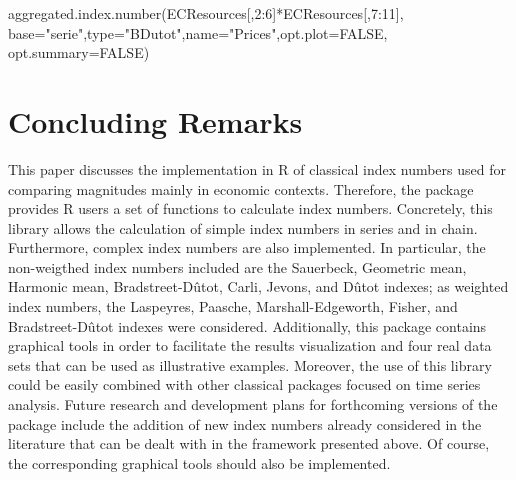 \begin{example}
aggregated.index.number(ECResources[,2:6]*ECResources[,7:11],
                        base="serie",type="BDutot",name="Prices",opt.plot=FALSE,
                        opt.summary=FALSE)
\end{example}

%
%
%
%
%
%
%


\section{Concluding Remarks}
This paper discusses the implementation in R of classical index numbers used for comparing magnitudes mainly in economic contexts. Therefore, the  package provides R users a set of functions to calculate   index numbers. Concretely, this library allows the calculation of simple index numbers in series and in chain. Furthermore, complex index numbers are also implemented. In particular, the non-weigthed index numbers included are the Sauerbeck, Geometric mean, Harmonic mean, Bradstreet-Dûtot, Carli, Jevons, and Dûtot indexes; as weighted index numbers, the Laspeyres, Paasche, Marshall-Edgeworth, Fisher, and Bradstreet-Dûtot indexes were considered. Additionally, this package contains graphical tools in order to facilitate the results visualization and four real data sets that can be used as illustrative examples. Moreover, the use of this library could be easily combined with other classical packages focused on time series analysis.  Future research and development plans for forthcoming versions of the package include the addition of new index numbers already considered in the  literature that can be dealt with in the framework presented above. Of course, the corresponding graphical tools should also be  implemented.




